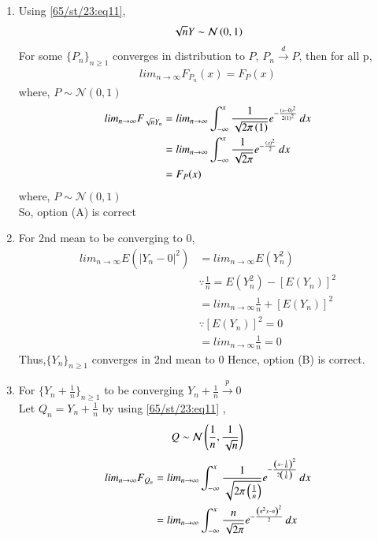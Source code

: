 \documentclass[journal,12pt,Twocolumn]{IEEEtran}
\theoremstyle{remark}
\begin{document}
\begin{enumerate}[label=(\Alph*)]
\item Using \eqref{65/st/23:eq11}, 
\begin{align}
\sqrt{n}Y \sim \mathcal{N}\left(0,1\right) 
\end{align}
For some $\{P_n\}_{n \geq 1}$  converges in distribution to $P$, $P_n \xrightarrow{d} P$, then for all p,
\begin{align}
lim_{n \to \infty} F_{P_n}(x) = F_{P}(x) 
\end{align}
where, $P \sim \mathcal{N}(0,1)$
\begin{align}
lim_{n \to \infty} F_{\sqrt{n}Y_n} 
&= lim_{n \to \infty} \int_{-\infty}^{x} \frac{1}{\sqrt{2\pi\left(1\right)}}e^{-\frac{\left(x-0\right)^2}{2\left(1\right)^2}} \,dx \\
&= lim_{n \to \infty} \int_{-\infty}^{x} \frac{1}{\sqrt{2\pi}}e^{-\frac{\left(x\right)^2}{2}} \,dx \\
&=F_P(x)
\end{align}
where, $P \sim \mathcal{N}(0,1)$ \\
So, option (A) is correct\
\item For 2nd mean to be converging to 0,
\begin{align}
lim_{n \to \infty} E(|Y_n-0|^2)&=lim_{n \to \infty} E(Y_n^2) \\
&\because \frac{1}{n} = E(Y_n^2) - [E(Y_n)]^2 \\
&=lim_{n \to \infty} \frac{1}{n} + [E(Y_n)]^2 \\
&\because [E(Y_n)]^2 = 0 \\
&=lim_{n \to \infty} \frac{1}{n} = 0 
\end{align}
Thus,$\{Y_n\}_{n \geq 1}$ converges in 2nd mean to 0
Hence, option (B) is correct.
\item For $\{Y_n+\frac{1}{n}\}_{n \geq 1}$ to be converging $Y_n +\frac{1}{n} \xrightarrow{p} 0$ \\
Let $Q_n = Y_n +\frac{1}{n}$ 
by using \eqref{65/st/23:eq11} ,
\begin{align}
Q \sim \mathcal{N}\left(\frac{1}{n},\frac{1}{\sqrt{n}}\right)
\end{align}  
\begin{align}
lim_{n \to \infty} F_{Q_n} 
&= lim_{n \to \infty} \int_{-\infty}^{x} \frac{1}{\sqrt{2\pi\brak{\frac{1}{n}}}}e^{-\frac{\brak{x-\frac{1}{n}}^2}{2\brak{\frac{1}{n}}}} \,dx \\
&= lim_{n \to \infty} \int_{-\infty}^{x} \frac{n}{\sqrt{2\pi}}e^{-\frac{\brak{n^2x-n}^2}{2}} \,dx \\

\end{align}
\end{enumerate}
\end{document}
